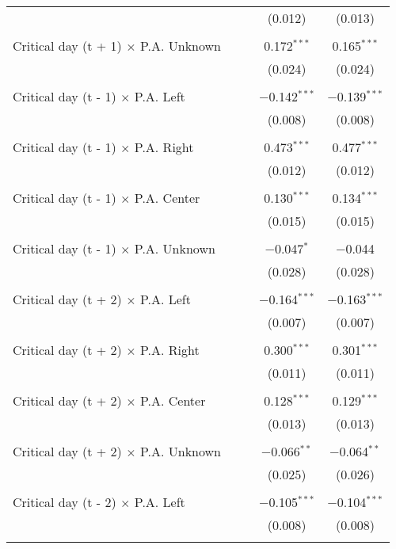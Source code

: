 \documentclass[
]{article}
\begin{document}
\begin{table}[!htbp]
{\begin{tabular}{@{\extracolsep{5pt}}lcccc}
  &  &  & (0.012) & (0.013) \\ 
  & & & & \\ 
 Critical day (t + 1) $\times$ P.A. Unknown &  &  & 0.172$^{***}$ & 0.165$^{***}$ \\ 
  &  &  & (0.024) & (0.024) \\ 
  & & & & \\ 
 Critical day (t - 1) $\times$ P.A. Left &  &  & $-$0.142$^{***}$ & $-$0.139$^{***}$ \\ 
  &  &  & (0.008) & (0.008) \\ 
  & & & & \\ 
 Critical day (t - 1) $\times$ P.A. Right &  &  & 0.473$^{***}$ & 0.477$^{***}$ \\ 
  &  &  & (0.012) & (0.012) \\ 
  & & & & \\ 
 Critical day (t - 1) $\times$ P.A. Center &  &  & 0.130$^{***}$ & 0.134$^{***}$ \\ 
  &  &  & (0.015) & (0.015) \\ 
  & & & & \\ 
 Critical day (t - 1) $\times$ P.A. Unknown &  &  & $-$0.047$^{*}$ & $-$0.044 \\ 
  &  &  & (0.028) & (0.028) \\ 
  & & & & \\ 
 Critical day (t + 2) $\times$ P.A. Left &  &  & $-$0.164$^{***}$ & $-$0.163$^{***}$ \\ 
  &  &  & (0.007) & (0.007) \\ 
  & & & & \\ 
 Critical day (t + 2) $\times$ P.A. Right &  &  & 0.300$^{***}$ & 0.301$^{***}$ \\ 
  &  &  & (0.011) & (0.011) \\ 
  & & & & \\ 
 Critical day (t + 2) $\times$ P.A. Center &  &  & 0.128$^{***}$ & 0.129$^{***}$ \\ 
  &  &  & (0.013) & (0.013) \\ 
  & & & & \\ 
 Critical day (t + 2) $\times$ P.A. Unknown &  &  & $-$0.066$^{**}$ & $-$0.064$^{**}$ \\ 
  &  &  & (0.025) & (0.026) \\ 
  & & & & \\ 
 Critical day (t - 2) $\times$ P.A. Left &  &  & $-$0.105$^{***}$ & $-$0.104$^{***}$ \\ 
  &  &  & (0.008) & (0.008) \\ 
  & & & & \\ 

\end{tabular}}
\end{table}
\end{document}
